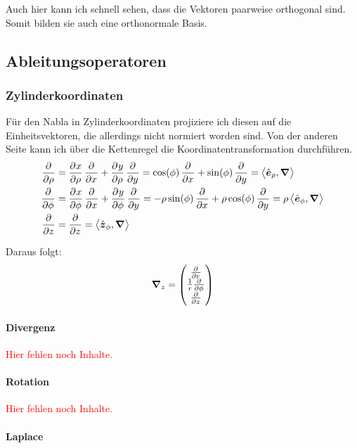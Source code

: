 \documentclass[11pt, ngerman]{article}
\newcommand{\fehlt}{\textcolor{red}{Hier fehlen noch Inhalte.}}
\newcommand{\inner}[2]{\left\langle #1, #2 \right\rangle}
\newcommand{\vnabla}{\vec \nabla}
\renewcommand{\vec}[1]{\boldsymbol{#1}}
\begin{document}
Auch hier kann ich schnell sehen, dass die Vektoren paarweise orthogonal sind. Somit bilden sie auch eine orthonormale Basis.

\subsection{Ableitungsoperatoren}


\subsubsection{Zylinderkoordinaten}


Für den Nabla in Zylinderkoordinaten projiziere ich diesen auf die
Einheitsvektoren, die allerdings nicht normiert worden sind. Von der anderen
Seite kann ich über die Kettenregel die Koordinatentransformation durchführen.
\begin{align*}
	\dpd{}\rho &= \dpd x\rho \dpd{}x + \dpd y\rho \dpd{}y = \cos(\phi) \dpd{}x + \sin(\phi) \dpd{}y = \inner{\hat{\vec e}_\rho}\vnabla \\
 \dpd{}\phi &= \dpd x\phi \dpd{}x + \dpd y\phi \dpd{}y= - \rho \sin(\phi) \dpd{}x + \rho \cos(\phi) \dpd{}y = \rho \inner{\hat{\vec e}_\phi}\vnabla \\
	  \dpd{} z &= \dpd{} z = \inner{\hat{\vec z}_\phi}\vnabla
\end{align*}

Daraus folgt:
\[
	\vnabla_z =
	\begin{pmatrix}
		\pd{}r \\
		\frac 1r \pd{}\phi \\
		\pd{}z
	\end{pmatrix}
\]


\paragraph{Divergenz}

\fehlt

\paragraph{Rotation}

\fehlt

\paragraph{Laplace}
\end{document}
